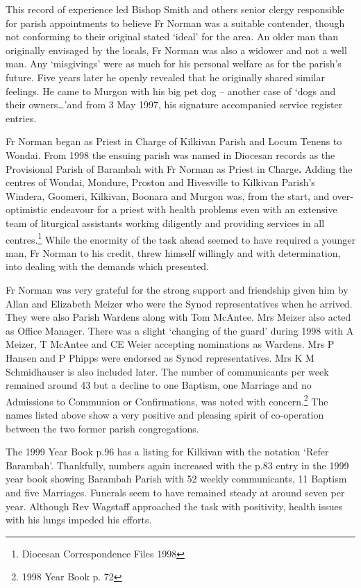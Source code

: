 This record of experience led Bishop Smith and others senior clergy responsible for parish appointments to believe Fr Norman was a suitable contender, though not conforming to their original stated `ideal' for the area. An older man than originally envisaged by the locals, Fr Norman was also a widower and not a well man. Any `misgivings' were as much for his personal welfare as for the parish's future. Five years later he openly revealed that he originally shared similar feelings. He came to Murgon with his big pet dog -- another case of `dogs and their owners\ldots'and from 3 May 1997, his signature accompanied service register entries.

Fr Norman began as Priest in Charge of Kilkivan Parish and Locum Tenens to Wondai. From 1998 the ensuing parish was named in Diocesan records as the Provisional Parish of Barambah with Fr Norman as Priest in Charge\textbf{.} Adding the centres of Wondai, Mondure, Proston and Hivesville to Kilkivan Parish's Windera, Goomeri, Kilkivan, Boonara and Murgon was, from the start, and over-optimistic endeavour for a priest with health problems even with an extensive team of liturgical assistants working diligently and providing services in all centres.\footnote{Diocesan Correspondence Files 1998} While the enormity of the task ahead seemed to have required a younger man, Fr Norman to his credit, threw himself willingly and with determination, into dealing with the demands which presented.

Fr Norman was very grateful for the strong support and friendship given him by Allan and Elizabeth Meizer who were the Synod representatives when he arrived. They were also Parish Wardens along with Tom McAntee. Mrs Meizer also acted as Office Manager. There was a slight `changing of the guard' during 1998 with A Meizer, T McAntee and CE Weier accepting nominations as Wardens. Mrs P Hansen and P Phipps were endorsed as Synod representatives. Mrs K M Schmidhauser is also included later. The number of communicants per week remained around 43 but a decline to one Baptism, one Marriage and no Admissions to Communion or Confirmations, was noted with concern.\footnote{1998 Year Book p. 72} The names listed above show a very positive and pleasing spirit of co-operation between the two former parish congregations.

The 1999 Year Book p.96 has a listing for Kilkivan with the notation `Refer Barambah'. Thankfully, numbers again increased with the p.83 entry in the 1999 year book showing Barambah Parish with 52 weekly communicants, 11 Baptism and five Marriages. Funerals seem to have remained steady at around seven per year. Although Rev Wagstaff approached the task with positivity, health issues with his lungs impeded his efforts.

